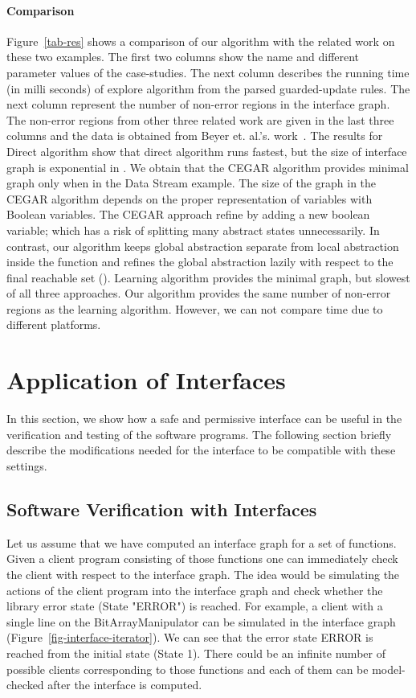 \documentclass{llncs}
\begin{document}
\paragraph{Comparison}  Figure~\ref{tab-res} shows a comparison of our algorithm with the related work on these two examples.
The first two columns show the name and different parameter values of the case-studies.
The next column describes the running time (in milli seconds) of explore algorithm from the parsed guarded-update rules.  
The next column represent the number of non-error regions in the interface graph.
The non-error regions from other three related work are given in the last three columns and the data is obtained from Beyer et. al.'s. work~\cite{beyerTR06}.
The results for Direct algorithm show that direct algorithm runs fastest, but the size of interface graph is exponential in .
We obtain that the CEGAR algorithm provides minimal graph only when  in the Data Stream example.
The size of the graph in the CEGAR algorithm depends on the proper representation of variables with Boolean variables.
The CEGAR approach refine by adding a new boolean variable; which has a risk of splitting many abstract states unnecessarily. 
In contrast, our algorithm keeps global abstraction separate from local abstraction inside the function and 
refines the global abstraction lazily with respect to the final reachable set (). 
Learning algorithm provides the minimal graph, but slowest of all three approaches.
Our algorithm provides the same number of non-error regions as the learning algorithm. 
However, we can not compare time due to different platforms.

\section{Application of Interfaces}

In this section, we show how a safe and permissive interface can be useful in the verification and testing of the software programs.
The following section briefly describe the modifications needed for the interface to be compatible with these settings. 

\subsection{Software Verification with Interfaces}

Let us assume that we have computed an interface graph for a set of functions.
Given a client program consisting of those functions one can immediately check the client with respect to the interface graph.
The idea would be simulating the actions of the client program into the interface graph and check whether the library error state (State "ERROR") is reached.
For example, a client with a single line  on the BitArrayManipulator  can be simulated in the interface graph 
(Figure~\ref{fig-interface-iterator}).
We can see that the error state ERROR is reached from the initial state (State 1).
There could be an infinite number of possible clients corresponding to those functions and each of them
can be model-checked after the interface is computed.  
\end{document}

